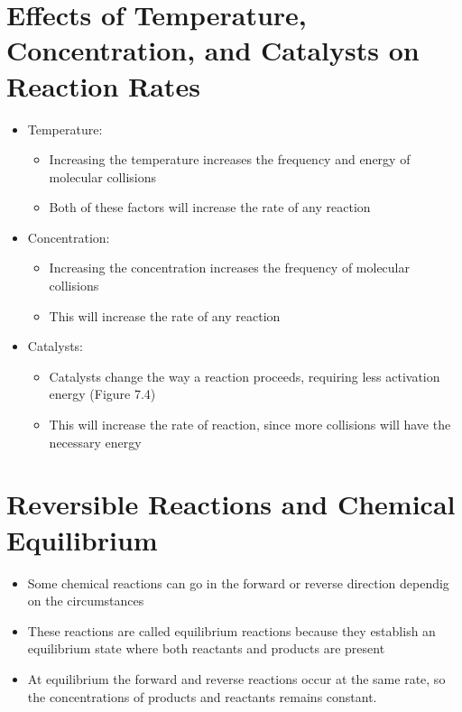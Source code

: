 \documentclass[12pt, openany, letterpaper]{memoir}
\begin{document}
\section{Effects of Temperature, Concentration, and Catalysts on Reaction Rates}
\begin{itemize}
	\item Temperature:
	      \begin{itemize}
		      \item Increasing the temperature increases the frequency and energy of molecular collisions
		      \item Both of these factors will increase the rate of any reaction
	      \end{itemize}
	\item Concentration:
	      \begin{itemize}
		      \item Increasing the concentration increases the frequency of molecular collisions
		      \item This will increase the rate of any reaction
	      \end{itemize}
	\item Catalysts:
	      \begin{itemize}
		      \item Catalysts change the way a reaction proceeds, requiring less activation energy (Figure 7.4)
		      \item This will increase the rate of reaction, since more collisions will have the necessary energy
	      \end{itemize}
\end{itemize}

\section{Reversible Reactions and Chemical Equilibrium}
\begin{itemize}
	\item Some chemical reactions can go in the forward or reverse direction dependig on the circumstances
	\item These reactions are called equilibrium reactions because they establish an equilibrium state where both reactants and products are present
	\item At equilibrium the forward and reverse reactions occur at the same rate, so the concentrations of products and reactants remains constant.
\end{itemize}
\end{document}
